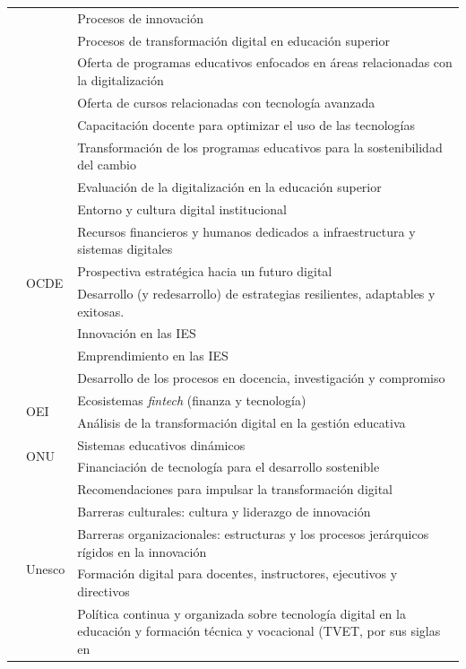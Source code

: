 \begin{longtable}{
>{\raggedright\arraybackslash}p{} l >{\raggedright\arraybackslash}p{}}
    & & Procesos de innovación \\
    & & Procesos de transformación digital en educación superior \\
    & & Oferta de programas educativos enfocados en áreas relacionadas con
    la digitalización \\
    & & Oferta de cursos relacionadas con tecnología avanzada \\
    & & Capacitación docente para optimizar el uso de las tecnologías \\
    & & Transformación de los programas educativos para la sostenibilidad
    del cambio \\
    & \multirow{8}{*}{OCDE} & Evaluación de la digitalización en la
    educación superior \\
    & & Entorno y cultura digital institucional \\
    & & Recursos financieros y humanos dedicados a infraestructura y
    sistemas digitales \\
    & & Prospectiva estratégica hacia un futuro digital \\
    & & Desarrollo (y redesarrollo) de estrategias resilientes, adaptables y
    exitosas. \\
    & & Innovación en las IES \\
    & & Emprendimiento en las IES \\
    & & Desarrollo de los procesos en docencia, investigación y
    compromiso \\
    & \multirow{2}{*}{OEI} & Ecosistemas \emph{fintech} (finanza y
    tecnología) \\
    & & Análisis de la transformación digital en la gestión educativa \\
    & \multirow{2}{*}{ONU} & Sistemas educativos dinámicos \\
    & & Financiación de tecnología para el desarrollo sostenible \\
    & \multirow{5}{*}{Unesco} & Recomendaciones para impulsar la
    transformación digital \\
    & & Barreras culturales: cultura y liderazgo de innovación \\
    & & Barreras organizacionales: estructuras y los procesos jerárquicos
    rígidos en la innovación \\
    & & Formación digital para docentes, instructores, ejecutivos y
    directivos \\
    & & Política continua y organizada sobre tecnología digital en la
    educación y formación técnica y vocacional (TVET, por sus siglas en

\end{longtable}
